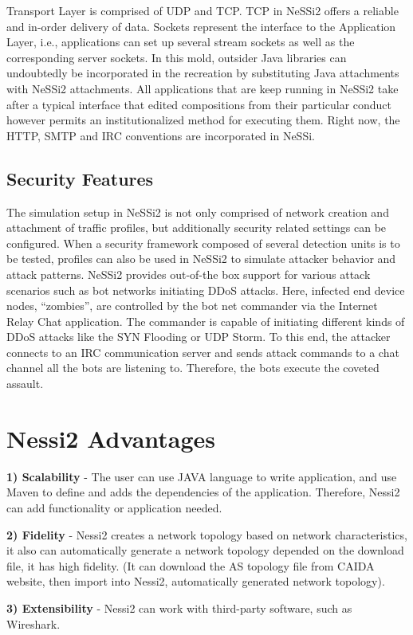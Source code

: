 Transport Layer is comprised of UDP and TCP. TCP in NeSSi2 offers a reliable and in-order delivery of data. Sockets represent the interface to the Application Layer, i.e., applications can set up several stream sockets as well as the corresponding server sockets. In this mold, outsider Java libraries can undoubtedly be incorporated in the recreation by substituting Java attachments with NeSSi2 attachments. All applications that are keep running in NeSSi2 take after a typical interface that edited compositions from their particular conduct however permits an institutionalized method for executing them. Right now, the HTTP, SMTP and IRC conventions are incorporated in NeSSi.
\subsection{Security Features}
The simulation setup in NeSSi2 is not only comprised of network creation and attachment
of traffic profiles, but additionally security related settings can be configured.
When a security framework composed of several detection units is to be tested, profiles
can also be used in NeSSi2 to simulate attacker behavior and attack patterns. NeSSi2 provides out-of-the box support for various attack scenarios such as bot networks initiating DDoS attacks. Here, infected end device nodes, “zombies”, are controlled by the bot net commander via the Internet Relay Chat application. The commander is capable of initiating different kinds of DDoS attacks like the SYN Flooding or UDP Storm. To this end, the attacker connects to an IRC communication server and sends attack commands to a chat channel all the bots are listening to. Therefore, the bots execute the coveted assault.
\section{Nessi2 Advantages}
\textbf{1) Scalability} - The user can use JAVA language to write application, and use Maven to define and adds the dependencies of the application. Therefore, Nessi2 can add functionality or application needed.

\textbf{2) Fidelity} - Nessi2 creates a network topology based on network characteristics, it also can automatically generate a network topology depended on the download file, it has high fidelity. (It can download the AS topology file from CAIDA website, then import into Nessi2, automatically generated network topology).

\textbf{3) Extensibility} - Nessi2 can work with third-party software, such as Wireshark.
